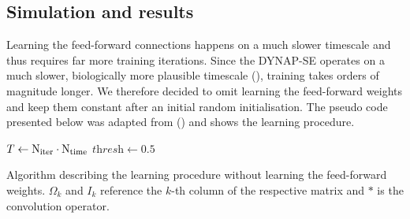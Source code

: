 \documentclass[twoside,11pt]{article}
\begin{document}
\subsection{Simulation and results}
Learning the feed-forward connections happens on a much slower timescale and thus requires
far more training iterations. Since the DYNAP-SE operates on a much slower, biologically
more plausible timescale (\cite{DBLP:journals/corr/abs-1708-04198}), training takes orders of magnitude longer. We therefore decided to omit
learning the feed-forward weights and keep them constant after an initial random initialisation.
The pseudo code presented below was adapted from (\cite{wiel2017learning}) and shows the learning procedure.

\vspace{1cm}
\IncMargin{1em}
\begin{algorithm}[H]
  \DontPrintSemicolon
  \label{algorithm_simulation}
  \BlankLine
  $T \leftarrow \textnormal{N}_\textnormal{iter} \cdot \textnormal{N}_{\textnormal{time}}$\;
  $\textit{thresh} \leftarrow 0.5$ \;
  \caption{Algorithm describing the learning procedure without learning the feed-forward weights.
  $\Omega_k$ and $I_k$ reference the
  $k$-th column of the respective matrix and $\ast$ is the convolution operator.}
\end{algorithm}
\DecMargin{1em}
\vspace{1cm}
\end{document}
